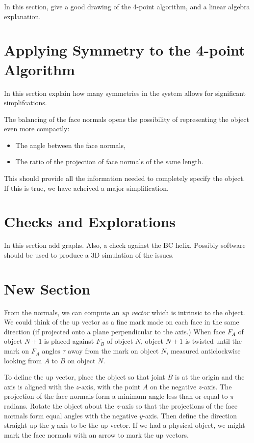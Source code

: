\documentclass[11pt]{article}
\begin{document}
{In this section, give a good drawing of the 4-point algorithm,
and a linear algebra explanation.

\section{Applying Symmetry to the 4-point Algorithm}

In this section explain how many symmetries in the system
allows for significant simplifcations.

The balancing of the face normals opens the possibility of representing
the object even more compactly:
\begin{itemize}
\item The angle between the face normals,
  \item The ratio of the projection of face normals of the same length.
\end{itemize}
This should provide all the information needed to completely specify the
object. If this is true, we have acheived a major simplification.

\section{Checks and Explorations}

In this section add graphs. Also, a check against the BC helix.
Possibly software should be used to produce a 3D simulation
of the issues.

\section{New Section}

From the normals, we can compute an {\em up vector} which is intrinsic to the object.
We could think of the up vector as a fine mark made on each face in the same direction
(if projected onto a plane perpendicular to the axis.) When face $F_A$ of object $N+1$
is placed against $F_B$ of object $N$, object $N+1$ is twisted until the mark on $F_A$ angles
$\tau$ away from the mark on object $N$, measured anticlockwise looking from $A$ to $B$ on
object $N$.

To define the up vector, place the object so that joint $B$ is at the origin and the
axis is aligned with the $z$-axis, with the point $A$ on the negative $z$-axis.
The projection of the face normals form a minimum angle less than or equal to $\pi$
radians. Rotate the object about the $z$-axis so that the projections of the face normals
form equal angles with the negative $y$-axis. Then define the direction straight up
the $y$ axis to be the up vector. If we had a physical object, we might mark the face
normals with an arrow to mark the up vectors.

}
\end{document}
